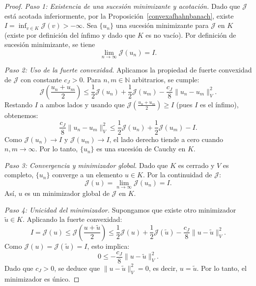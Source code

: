 \documentclass[12pt]{book}
\theoremstyle{definition}
\theoremstyle{plain}
\theoremstyle{remark}
\begin{document}
\begin{proof}
    
    \emph{Paso 1: Existencia de una sucesión minimizante y acotación.}
    Dado que \(\mathcal{J}\) está acotada inferiormente, por la Proposición~\ref{convexafhahnbanach}, existe \(I = \inf_{v \in K} \mathcal{J}(v) > -\infty\). 
    Sea \(\{u_n\}\) una sucesión minimizante para \(\mathcal{J}\) en \(K\) (existe por definición del ínfimo y dado que \(K\) es no vacío).
    Por definición de sucesión minimizante, se tiene \[\lim_{n \to \infty} \mathcal{J}(u_n) = I.\]

    \emph{Paso 2: Uso de la fuerte convexidad.}
    Aplicamos la propiedad de fuerte convexidad de \(\mathcal{J}\) con constante \(c_J > 0\). Para \(n, m \in \mathbb{N}\) arbitrarios, se cumple:
    \[
    \mathcal{J}\left(\frac{u_n + u_m}{2}\right) \leq \frac{1}{2} \mathcal{J}(u_n) + \frac{1}{2} \mathcal{J}(u_m) - \frac{c_J}{8} \| u_n - u_m \|_V^2.
    \]
    Restando \(I\) a ambos lados y usando que \(\mathcal{J}\left(\frac{u_n + u_m}{2}\right) \geq I\) (pues \(I\) es el ínfimo), obtenemos:
    \[
    \frac{c_J}{8} \| u_n - u_m \|^2_V \leq \frac{1}{2} \mathcal{J}(u_n) + \frac{1}{2} \mathcal{J}(u_m) - I.
    \]
    Como \(\mathcal{J}(u_n) \to I\) y \(\mathcal{J}(u_m) \to I\), el lado derecho tiende a cero cuando \(n, m \to \infty\). Por lo tanto, \(\{u_n\}\) es una sucesión de Cauchy en \(K\).

\medskip

    \emph{Paso 3: Convergencia y minimizador global.}
    Dado que \(K\) es cerrado y \(V\) es completo, \(\{u_n\}\) converge a un elemento \(u \in K\). Por la continuidad de \(\mathcal{J}\):
    \[
    \mathcal{J}(u) = \lim_{n \to \infty} \mathcal{J}(u_n) = I.
    \]
    Así, \(u\) es un minimizador global de \(\mathcal{J}\) en \(K\).

\medskip

    \emph{Paso 4: Unicidad del minimizador.}
    Supongamos que existe otro minimizador \(\tilde{u} \in K\). Aplicando la fuerte convexidad:
    \[
    I = \mathcal{J}(u) \leq \mathcal{J}\left(\frac{u + \tilde{u}}{2}\right) \leq \frac{1}{2} \mathcal{J}(u) + \frac{1}{2} \mathcal{J}(\tilde{u}) - \frac{c_J}{8} \| u - \tilde{u} \|^2_V.
    \]
    Como \(\mathcal{J}(u) = \mathcal{J}(\tilde{u}) = I\), esto implica:
    \[
    0 \leq -\frac{c_J}{8} \| u - \tilde{u} \|^2_V.
    \]
    Dado que \(c_J > 0\), se deduce que \(\| u - \tilde{u} \|^2_V = 0\), es decir, \(u = \tilde{u}\). Por lo tanto, el minimizador es único.


\end{proof}
\end{document}
